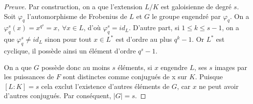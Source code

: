 \begin{proof}[Preuve]
	Par construction, on a que l'extension $L/K$ est galoisienne de degré $s$.
	Soit $\varphi_{q}$ l'automorphisme de Frobenius de $L$ et $G$ le groupe engendré par $\varphi_{q}$.
	On a $\varphi_{q}^{s}(x)=x^{q}^{s}=x,\ \forall x\in L$, d'où $\varphi_{q}^{s}=id_{L}$.
	D'autre part, si $1\leq k\leq s-1$, on a que $\varphi_{q}^{s}\neq id_{L}$ sinon pour tout $x\in L^{\ast}$ est d'ordre au plus $q^{k}-1$.
	Or $L^{\ast}$ est cyclique, il possède ainsi un élément d'ordre $q^{s}-1$.

	On a que $G$ possède donc au moins $s$ éléments, si $x$ engendre $L$, ses $s$ images par les puissances de $F$ sont distinctes comme conjugués de x sur $K$.
	Puisque $[L:K]=s$ cela exclut l'existence d'autres éléments de $G$, car $x$ ne peut avoir d'autres conjugués.
	Par conséquent, $\left|G\right|=s$.
\end{proof}